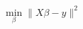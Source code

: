 \documentclass[convert={density=300,outext=.png}]{standalone}
\begin{document}
\begin{minipage}[t]{0.3\textwidth}
\begin{align*}
\min_\beta \|X\beta - y\|^2
\end{align*}
\end{minipage}
\end{document}
